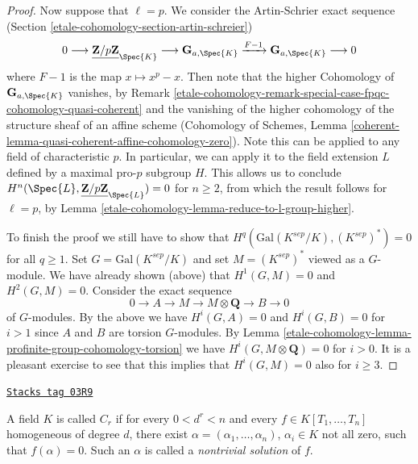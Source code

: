 \begin{proof}
\medskip\noindent
Now suppose that $\ell = p$. We consider the
Artin-Schrier exact sequence (Section \ref{etale-cohomology-section-artin-schreier})
$$
0 \longrightarrow \underline{\mathbf{Z}/p\mathbf{Z}}_{\Spec{K}} \longrightarrow
\mathbf{G}_{a, \Spec{K}} \xrightarrow{F-1} \mathbf{G}_{a, \Spec{K}}
\longrightarrow 0
$$
where $F - 1$ is the map $x \mapsto x^p - x$. Then note that the higher
Cohomology of $\mathbf{G}_{a, \Spec{K}}$ vanishes, by
Remark \ref{etale-cohomology-remark-special-case-fpqc-cohomology-quasi-coherent} and the
vanishing of the higher cohomology of the structure sheaf of an affine scheme
(Cohomology of Schemes, Lemma
\ref{coherent-lemma-quasi-coherent-affine-cohomology-zero}).
Note this can be applied to any field of
characteristic $p$. In particular, we can apply it to the field extension $L$
defined by a maximal pro-$p$ subgroup $H$. This allows us to conclude
$H^n(\Spec{L}, \underline{\mathbf{Z}/p\mathbf{Z}}_{\Spec{L}}) = 0$
for $n \geq 2$, from which the result follows for $\ell = p$, by
Lemma \ref{etale-cohomology-lemma-reduce-to-l-group-higher}.

\medskip\noindent
To finish the proof we still have to show that
$H^q(\text{Gal}(K^{sep}/K), (K^{sep})^*) = 0$ for all $q \geq 1$.
Set $G = \text{Gal}(K^{sep}/K)$ and set $M = (K^{sep})^*$
viewed as a $G$-module. We have already shown (above) that
$H^1(G, M) = 0$ and $H^2(G, M) = 0$. Consider the exact sequence
$$
0 \to A \to M \to M \otimes \mathbf{Q} \to B \to 0
$$
of $G$-modules. By the above we have $H^i(G, A) = 0$
and $H^i(G, B) = 0$ for $i > 1$ since $A$ and $B$ are
torsion $G$-modules. By
Lemma \ref{etale-cohomology-lemma-profinite-group-cohomology-torsion}
we have $H^i(G, M \otimes \mathbf{Q}) = 0$ for $i > 0$.
It is a pleasant exercise to see that this implies that
$H^i(G, M) = 0$ also for $i \geq 3$.
\end{proof}


\begin{definition}[Cr]
\label{etale-cohomology-definition-Cr}
\href{https://stacks.math.columbia.edu/tag/03R9}{\texttt{Stacks tag 03R9}}

A field $K$ is called {\it $C_r$}
if for every $0 < d^r < n$ and every $f \in K[T_1,
\ldots, T_n]$ homogeneous of degree $d$, there exist $\alpha = (\alpha_1,
\ldots, \alpha_n)$, $\alpha_i \in K$ not all zero, such that $f(\alpha) = 0$.
Such an $\alpha$ is called a {\it nontrivial solution} of $f$.
\end{definition}

